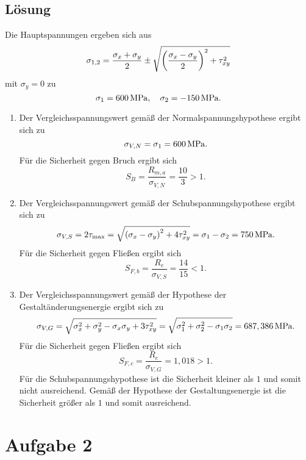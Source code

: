 \documentclass{exercise}
\begin{document}
    \subsection*{Lösung}
    Die Hauptspannungen ergeben sich aus
    \[
        \sigma_{1, 2} = \frac{\sigma_x + \sigma_y}{2} \pm \sqrt{\parentheses*{\frac{\sigma_x - \sigma_y}{2}}^2 + \tau_{xy}^2}
    \]
    mit \(\sigma_y = 0\) zu
    \[
        \sigma_1 = 600\sis{\mega\pascal}, \quad \sigma_2 = -150\sis{\mega\pascal}.
    \]
    \begin{enumerate}
        \item Der Vergleichsspannungswert gemäß der Normalspannungshypothese ergibt sich zu
        \[
            \sigma_{V, N} = \sigma_1 = 600\sis{\mega\pascal}.
        \]
        Für die Sicherheit gegen Bruch ergibt sich
        \[
            S_B = \frac{R_{m, a}}{\sigma_{V, N}} = \frac{10}{3} > 1.
        \]
        \item Der Vergleichsspannungswert gemäß der Schubspannungshypothese ergibt sich zu
        \[
            \sigma_{V, S} = 2\tau_{\text{max}} = \sqrt{\parentheses*{\sigma_x - \sigma_y}^2 + 4\tau_{xy}^2} = \sigma_1 - \sigma_2 = 750\sis{\mega\pascal}.
        \]
        Für die Sicherheit gegen Fließen ergibt sich
        \[
            S_{F, b} = \frac{R_e}{\sigma_{V, S}} = \frac{14}{15} < 1.
        \]
        \item Der Vergleichsspannungswert gemäß der Hypothese der Gestaltänderungsenergie ergibt sich zu
        \[
            \sigma_{V, G} = \sqrt{\sigma_x^2 + \sigma_y^2 - \sigma_x \sigma_y + 3\tau_{xy}^2} = \sqrt{\sigma_1^2 + \sigma_2^2 - \sigma_1 \sigma_2} = 687,386\sis{\mega\pascal}.
        \]
        Für die Sicherheit gegen Fließen ergibt sich
        \[
            S_{F, c} = \frac{R_e}{\sigma_{V, G}} = 1,018 > 1.
        \]
        Für die Schubspannungshypothese ist die Sicherheit kleiner als \(1\) und somit nicht ausreichend.
        Gemäß der Hypothese der Gestaltungsenergie ist die Sicherheit größer als \(1\) und somit ausreichend.
    \end{enumerate}


    \section*{Aufgabe 2}
\end{document}
